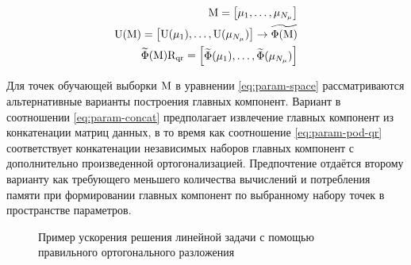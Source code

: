 \begin{align}
    \matr{M} =\begin{bmatrix}
        \param_1, \dots, \param_{N_\param}
    \end{bmatrix} \label{eq:param-space}\\
    \matr{U}(\matr{M}) =
    \begin{bmatrix}
        \matr{U}(\param_1), \dots, \matr{U}(\param_{N_\param})
    \end{bmatrix}
    \rightarrow \widetilde{\Phi (\matr{M})} \label{eq:param-concat}\\
    \widetilde{\Phi} (\matr{M}) \matr{R}_\text{qr} =
    \begin{bmatrix}
        \widetilde{\Phi}(\param_1), \dots,  \widetilde{\Phi}(\param_{N_\param})
    \end{bmatrix} \label{eq:param-pod-qr}
\end{align}

Для точек обучающей выборки $\matr{M}$ в уравнении \ref{eq:param-space} рассматриваются альтернативные варианты построения главных компонент.
Вариант в соотношении \ref{eq:param-concat} предполагает извлечение главных компонент из конкатенации матриц данных, в то время как соотношение \ref{eq:param-pod-qr} соответствует конкатенации независимых наборов главных компонент с дополнительно произведенной ортогонализацией.
Предпочтение отдаётся второму варианту как требующего меньшего количества вычислений и потребления памяти при формировании главных компонент по выбранному набору точек в пространстве параметров.

\begin{figure}[ht]
    \caption{Пример ускорения решения линейной задачи с помощью правильного ортогонального разложения~\cite{Elizarev2022}}\label{fig:ROM-I}
\end{figure}

